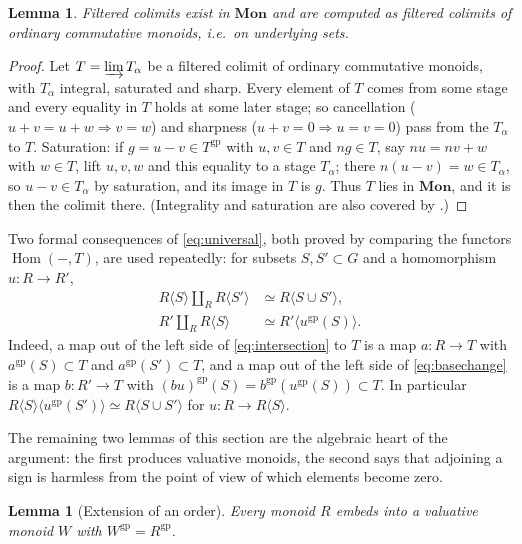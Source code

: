 \documentclass[11pt]{article}
\newcommand{\gp}{\mathrm{gp}}
\newcommand{\Hom}{\operatorname{Hom}}
\newtheorem{lemma}[theorem]{Lemma}
\theoremstyle{definition}
\theoremstyle{remark}
\begin{document}
\begin{lemma}\label{lem:filtered}
Filtered colimits exist in \(\mathbf{Mon}\) and are computed as filtered
colimits of ordinary commutative monoids, i.e.\ on underlying sets.
\end{lemma}

\begin{proof}
Let \(T=\varinjlim T_\alpha\) be a filtered colimit of ordinary commutative
monoids, with \(T_\alpha\) integral, saturated and sharp.  Every element of
\(T\) comes from some stage and every equality in \(T\) holds at some later
stage; so cancellation (\(u+v=u+w\Rightarrow v=w\)) and sharpness
(\(u+v=0\Rightarrow u=v=0\)) pass from the \(T_\alpha\) to \(T\).
Saturation: if \(g=u-v\in T^{\gp}\) with \(u,v\in T\) and \(ng\in T\), say
\(nu=nv+w\) with \(w\in T\), lift \(u,v,w\) and this equality to a stage
\(T_\alpha\); there \(n(u-v)=w\in T_\alpha\), so \(u-v\in T_\alpha\) by
saturation, and its image in \(T\) is \(g\).  Thus \(T\) lies in
\(\mathbf{Mon}\), and it is then the colimit there.  (Integrality and
saturation are also covered by \cite[Prop.~I.1.3.6]{ogus}.)
\end{proof}

Two formal consequences of \eqref{eq:universal}, both proved by comparing
the functors \(\Hom(-,T)\), are used repeatedly: for subsets
\(S,S'\subset G\) and a homomorphism \(u:R\to R'\),
\begin{align}
 R\langle S\rangle\amalg_R R\langle S'\rangle
       &\simeq R\langle S\cup S'\rangle, \label{eq:intersection}\\
 R'\amalg_R R\langle S\rangle
       &\simeq R'\langle u^{\gp}(S)\rangle .\label{eq:basechange}
\end{align}
Indeed, a map out of the left side of \eqref{eq:intersection} to \(T\) is a
map \(a:R\to T\) with \(a^{\gp}(S)\subset T\) and \(a^{\gp}(S')\subset T\),
and a map out of the left side of \eqref{eq:basechange} is a map
\(b:R'\to T\) with \((bu)^{\gp}(S)=b^{\gp}(u^{\gp}(S))\subset T\).
In particular \(R\langle S\rangle\langle u^{\gp}(S')\rangle
\simeq R\langle S\cup S'\rangle\) for \(u:R\to R\langle S\rangle\).

The remaining two lemmas of this section are the algebraic heart of the
argument: the first produces valuative monoids, the second says that
adjoining a sign is harmless from the point of view of which elements become
zero.

\begin{lemma}[Extension of an order]\label{lem:order}
Every monoid \(R\) embeds into a valuative monoid \(W\) with
\(W^{\gp}=R^{\gp}\).
\end{lemma}
\end{document}
